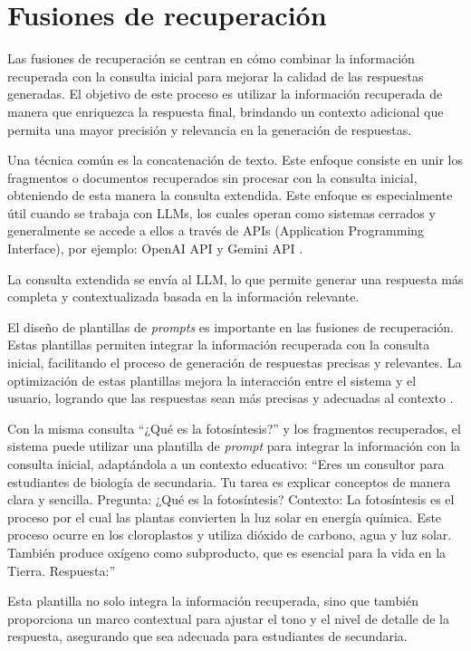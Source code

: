 \documentclass{article}
\begin{document}
\section{Fusiones de recuperación}

Las fusiones de recuperación se centran en cómo combinar la información recuperada con la consulta inicial para mejorar la calidad de las respuestas generadas. El objetivo de este proceso es utilizar la información recuperada de manera que enriquezca la respuesta final, brindando un contexto adicional que permita una mayor precisión y relevancia en la generación de respuestas.

Una técnica común es la concatenación de texto. Este enfoque consiste en unir los fragmentos o documentos recuperados sin procesar con la consulta inicial, obteniendo de esta manera la consulta extendida. Este enfoque es especialmente útil cuando se trabaja con LLMs, los cuales operan como sistemas cerrados y generalmente se accede a ellos a través de APIs (Application Programming Interface), por ejemplo: OpenAI API \cite{openai_api} y Gemini API \cite{gemini_model}.

La consulta extendida se envía al LLM, lo que permite generar una respuesta más completa y contextualizada basada en la información relevante.

El diseño de plantillas de \textit{prompts} es importante en las fusiones de recuperación. Estas plantillas permiten integrar la información recuperada con la consulta inicial, facilitando el proceso de generación de respuestas precisas y relevantes. La optimización de estas plantillas mejora la interacción entre el sistema y el usuario, logrando que las respuestas sean más precisas y adecuadas al contexto \cite{sahoo2024systematicsurveypromptengineering}.

Con la misma consulta ``¿Qué es la fotosíntesis?'' y los fragmentos recuperados, el sistema puede utilizar una plantilla de \textit{prompt} para integrar la información con la consulta inicial, adaptándola a un contexto educativo:
``Eres un consultor para estudiantes de biología de secundaria. Tu tarea es explicar conceptos de manera clara y sencilla. Pregunta: ¿Qué es la fotosíntesis? Contexto: La fotosíntesis es el proceso por el cual las plantas convierten la luz solar en energía química. Este proceso ocurre en los cloroplastos y utiliza dióxido de carbono, agua y luz solar. También produce oxígeno como subproducto, que es esencial para la vida en la Tierra. Respuesta:''

Esta plantilla no solo integra la información recuperada, sino que también proporciona un marco contextual para ajustar el tono y el nivel de detalle de la respuesta, asegurando que sea adecuada para estudiantes de secundaria.
\end{document}
